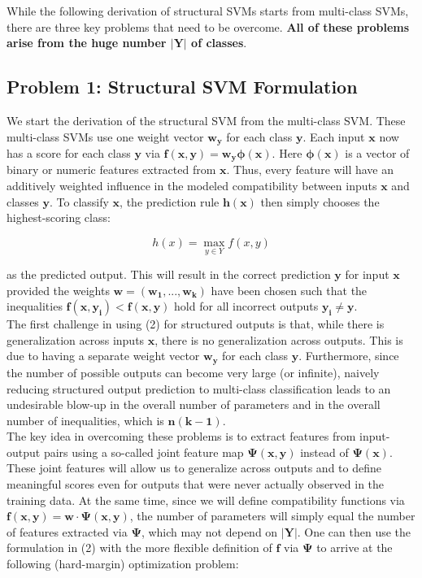 \documentclass[twoside]{article}
\begin{document}
While the following derivation of structural SVMs
starts from multi-class SVMs, there are three key problems
that need to be overcome. \textbf{All of these problems arise from
the huge number $\mathbf{|Y|}$ of classes}. 
\newpage

\subsection{Problem 1: Structural SVM Formulation}
We start the derivation of the structural SVM from the multi-class SVM. These multi-class SVMs use one weight vector $\mathbf{w_{y}}$ for each class $\mathbf{y}$. Each input
$\mathbf{x}$ now has a score for each class $\mathbf{y}$ via $\mathbf{f(x,y) = w_{y} \phi(x)}$.
Here $\mathbf{\phi(x)}$ is a vector of binary or numeric features extracted
from $\mathbf{x}$. Thus, every feature will have an additively weighted
influence in the modeled compatibility between inputs $\mathbf{x}$ and
classes $\mathbf{y}$. To classify $\mathbf{x}$, the prediction rule $\mathbf{h(x)}$ then simply
chooses the highest-scoring class:

\begin{equation}
    h(x) = \max_{y \in Y} f(x,y)
\end{equation}

as the predicted output. This will result in the correct prediction $\mathbf{y}$ for input $\mathbf{x}$ provided the weights $\mathbf{w = (w_{1}, . . . , w_{k})}$
have been chosen such that the inequalities $\mathbf{f(x,y_{i}) < f(x, y)}$
hold for all incorrect outputs $\mathbf{y_{i} \not =  y}$. \\

The first challenge in using (2) for structured outputs is that, while there is generalization across inputs $\mathbf{x}$, there is no generalization across outputs. This is due to having a
separate weight vector $\mathbf{w_y}$ for each class $\mathbf{y}$. Furthermore,
since the number of possible outputs can become very large (or infinite), naively reducing structured output prediction
to multi-class classification leads to an undesirable blow-up
in the overall number of parameters and in the overall number of inequalities, which is $\mathbf{n(k-1)}$. \\

The key idea in overcoming these problems is to extract
features from input-output pairs using a so-called joint feature map $\mathbf{\Psi(x, y)}$ instead of $\mathbf{\Psi(x)}$. These joint features will allow us to generalize across outputs and to define meaningful scores even
for outputs that were never actually observed in the training data. At the same time, since we will define compatibility
functions via $\mathbf{f(x, y) = w\cdot \Psi(x, y)}$, the number of parameters will simply equal the number of features extracted via
$\mathbf{\Psi}$, which may not depend on $\mathbf{|Y|}$. One can then use the formulation in (2) with the more flexible definition of $\mathbf{f}$ via $\mathbf{\Psi}$ to
arrive at the following (hard-margin) optimization problem:
\end{document}
